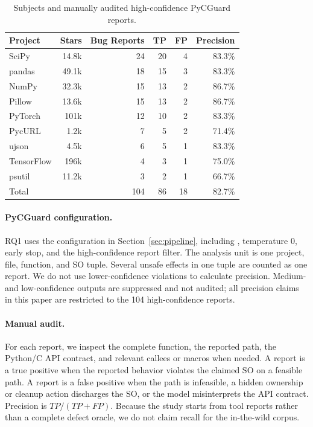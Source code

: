 \begin{table}[t]
\caption{Subjects and manually audited high-confidence PyCGuard reports.}
\label{tab:subjects}
\centering
\small
\setlength{\tabcolsep}{3.5pt}
\begin{tabular}{l|r|r|r|r|r}
\toprule
Project & Stars & Bug Reports & TP & FP & Precision \\
\midrule
SciPy      & 14.8k & 24 & 20 & 4 & 83.3\% \\
pandas     & 49.1k & 18 & 15 & 3 & 83.3\% \\
NumPy      & 32.3k & 15 & 13 & 2 & 86.7\% \\
Pillow     & 13.6k & 15 & 13 & 2 & 86.7\% \\
PyTorch    & 101k  & 12 & 10 & 2 & 83.3\% \\
PycURL     &  1.2k &  7 &  5 & 2 & 71.4\% \\
ujson      &  4.5k &  6 &  5 & 1 & 83.3\% \\
TensorFlow & 196k  &  4 &  3 & 1 & 75.0\% \\
psutil     & 11.2k &  3 &  2 & 1 & 66.7\% \\
\midrule
Total      &       & 104 & 86 & 18 & 82.7\% \\
\bottomrule
\end{tabular}
\end{table}

\paragraph{PyCGuard configuration.}
RQ1 uses the configuration in Section~\ref{sec:pipeline}, including
, temperature 0, early stop, and the
high-confidence report filter. The analysis unit is one project, file,
function, and SO tuple. Several unsafe effects in one tuple are counted as one
report. We do not use lower-confidence violations to calculate precision.
Medium- and low-confidence outputs are suppressed and not audited;
all precision claims in this paper are restricted to the 104
high-confidence reports.

\paragraph{Manual audit.}
For each report, we inspect the complete function, the reported path, the
Python/C API contract, and relevant callees or macros when needed. A report is
a true positive when the reported behavior violates the claimed SO on a
feasible path. A report is a false positive when the path is infeasible, a
hidden ownership or cleanup action discharges the SO, or the model
misinterprets the API contract. Precision is $TP/(TP+FP)$. Because the study
starts from tool reports rather than a complete defect oracle, we do not claim
recall for the in-the-wild corpus.

